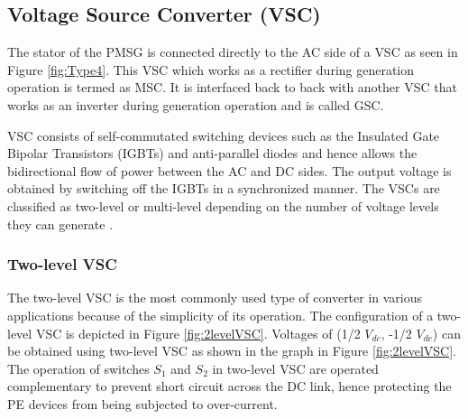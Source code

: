 



\subsection{Voltage Source Converter (VSC)}\label{VSC_theory}
The stator of the \gls{PMSG} is connected directly to the \gls{AC} side of a \gls{VSC} as seen in Figure \ref{fig:Type4}. This \gls{VSC} which works as a rectifier during generation operation is termed as \gls{MSC}. It is interfaced back to back with another \gls{VSC} that works as an inverter during generation operation and is called \gls{GSC}.

\gls{VSC} consists of self-commutated switching devices such as the Insulated Gate Bipolar Transistors (\gls{IGBT}s) and anti-parallel diodes and hence allows the bidirectional flow of power between the \gls{AC} and \gls{DC} sides. The output voltage is obtained by switching off the \gls{IGBT}s in a synchronized manner. The \gls{VSC}s are classified as two-level or multi-level depending on the number of voltage levels they can generate \cite{noauthor_appendix_2014}. 

\subsubsection{Two-level VSC}
The two-level \gls{VSC} is the most commonly used type of converter in various applications because of the simplicity of its operation. The configuration of a two-level \gls{VSC} is depicted in Figure \ref{fig:2levelVSC}. Voltages of (1/2 $V_{dc}$, -1/2 $V_{dc}$) can be obtained using two-level \gls{VSC} as shown in the graph in Figure \ref{fig:2levelVSC}. The operation of switches $S_{1}$ and $S_{2}$ in two-level \gls{VSC} are operated complementary to prevent short circuit across the \gls{DC} link, hence protecting the \gls{PE} devices from being subjected to over-current.

